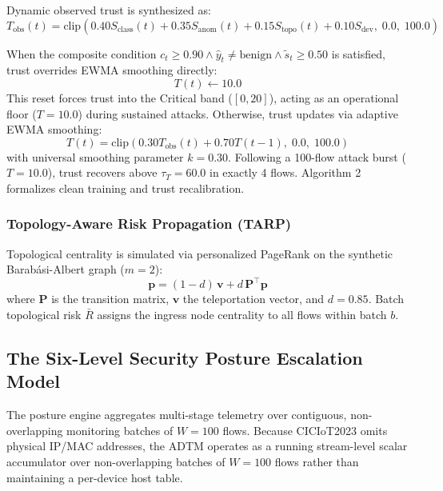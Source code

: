 \documentclass[journal,10pt,onecolumn]{IEEEtran}
\begin{document}
Dynamic observed trust is synthesized as:
$$T_{\text{obs}}(t) = \text{clip}\left(0.40 S_{\text{class}}(t) + 0.35 S_{\text{anom}}(t) + 0.15 S_{\text{topo}}(t) + 0.10 S_{\text{dev}}, \; 0.0, \; 100.0\right)$$

When the composite condition $c_t \ge 0.90 \land \hat{y}_t \ne \text{benign} \land \tilde{s}_t \ge 0.50$ is satisfied, trust overrides EWMA smoothing directly:
$$T(t) \leftarrow 10.0$$
This reset forces trust into the Critical band ($[0, 20]$), acting as an operational floor ($T = 10.0$) during sustained attacks. Otherwise, trust updates via adaptive EWMA smoothing:
$$T(t) = \text{clip}\left(0.30 T_{\text{obs}}(t) + 0.70 T(t-1), \; 0.0, \; 100.0\right)$$
with universal smoothing parameter $k = 0.30$. Following a 100-flow attack burst ($T = 10.0$), trust recovers above $\tau_T = 60.0$ in exactly 4 flows. Algorithm 2 formalizes clean training and trust recalibration.

\subsubsection{Topology-Aware Risk Propagation (TARP)}
Topological centrality is simulated via personalized PageRank on the synthetic Barabási-Albert graph ($m=2$):
$$\mathbf{p} = (1 - d)\,\mathbf{v} + d\,\mathbf{P}^{\top}\mathbf{p}$$
where $\mathbf{P}$ is the transition matrix, $\mathbf{v}$ the teleportation vector, and $d=0.85$. Batch topological risk $\bar{R}$ assigns the ingress node centrality to all flows within batch $b$.

\subsection{The Six-Level Security Posture Escalation Model}
The posture engine aggregates multi-stage telemetry over contiguous, non-overlapping monitoring batches of $W = 100$ flows. Because CICIoT2023 omits physical IP/MAC addresses, the ADTM operates as a running stream-level scalar accumulator over non-overlapping batches of $W = 100$ flows rather than maintaining a per-device host table.
\end{document}
